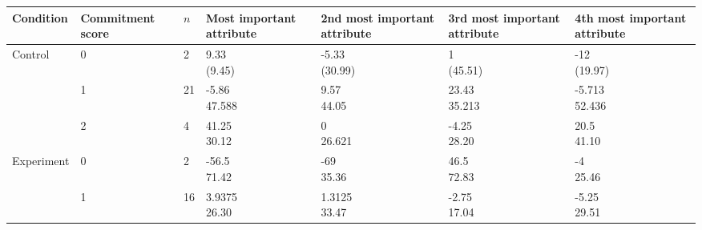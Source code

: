 



\begin{table*}
  \centering

  \begingroup
    \small
    \begin{tabularx}{\textwidth}{XXXXXXX}
      \toprule
      
      Condition
      &
      Commit\-ment score
      &
      $n$
      &
      Most important attribute
      &
      2nd most important attribute
      &
      3rd most important attribute
      &
      4th most important attribute
      \\

      \midrule
      
      Control
      &
      0
      &
      2
      & \cellcontent{9.33\\(9.45)}
      & \cellcontent{-5.33\\(30.99)}
      & \cellcontent{1\\(45.51)}
      & \cellcontent{-12\\(19.97)}
      \\
      
      &
      1
      &
      21
      & \cellcontent{-5.86\\47.588}
      & \cellcontent{9.57\\44.05}
      & \cellcontent{23.43\\35.213}
      & \cellcontent{-5.713\\52.436}
      \\
      
      &
      2
      &
      4
      & \cellcontent{41.25\\30.12}
      & \cellcontent{0\\26.621}
      & \cellcontent{-4.25\\28.20}
      & \cellcontent{20.5\\41.10}
      \\
      
      
      Experiment
      &
      0
      &
      2
      & \cellcontent{-56.5\\71.42}
      & \cellcontent{-69\\35.36}
      & \cellcontent{46.5\\72.83}
      & \cellcontent{-4\\25.46}
      \\
      
      &
      1
      &
      16
      & \cellcontent{3.9375\\26.30}
      & \cellcontent{1.3125\\33.47}
      & \cellcontent{-2.75\\17.04}
      & \cellcontent{-5.25\\29.51}
      \\
      

\end{tabularx}
\end{table*}
